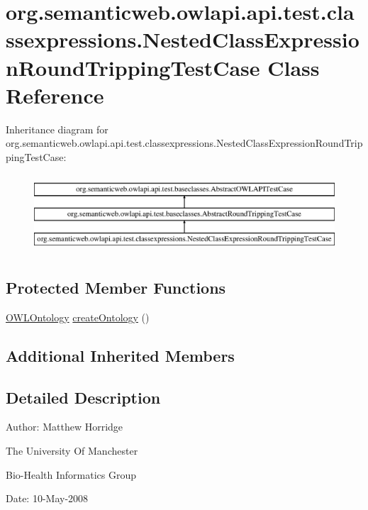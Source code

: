 \hypertarget{classorg_1_1semanticweb_1_1owlapi_1_1api_1_1test_1_1classexpressions_1_1_nested_class_expression_round_tripping_test_case}{\section{org.\-semanticweb.\-owlapi.\-api.\-test.\-classexpressions.\-Nested\-Class\-Expression\-Round\-Tripping\-Test\-Case Class Reference}
\label{classorg_1_1semanticweb_1_1owlapi_1_1api_1_1test_1_1classexpressions_1_1_nested_class_expression_round_tripping_test_case}
}
Inheritance diagram for org.\-semanticweb.\-owlapi.\-api.\-test.\-classexpressions.\-Nested\-Class\-Expression\-Round\-Tripping\-Test\-Case\-:\begin{figure}[H]
\begin{center}
\leavevmode
\includegraphics[height=2.952548cm]{classorg_1_1semanticweb_1_1owlapi_1_1api_1_1test_1_1classexpressions_1_1_nested_class_expression_round_tripping_test_case}
\end{center}
\end{figure}
\subsection*{Protected Member Functions}
\begin{DoxyCompactItemize}
\item 
\hyperlink{interfaceorg_1_1semanticweb_1_1owlapi_1_1model_1_1_o_w_l_ontology}{O\-W\-L\-Ontology} \hyperlink{classorg_1_1semanticweb_1_1owlapi_1_1api_1_1test_1_1classexpressions_1_1_nested_class_expression_round_tripping_test_case_ad3ee92d5bb507e6e0f64343edc231a06}{create\-Ontology} ()
\end{DoxyCompactItemize}
\subsection*{Additional Inherited Members}


\subsection{Detailed Description}
Author\-: Matthew Horridge\par
 The University Of Manchester\par
 Bio-\/\-Health Informatics Group\par
 Date\-: 10-\/\-May-\/2008\par
 \par
 

